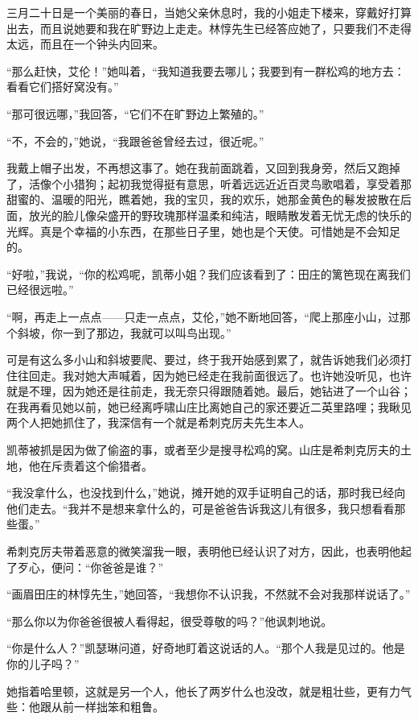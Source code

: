 \par 三月二十日是一个美丽的春日，当她父亲休息时，我的小姐走下楼来，穿戴好打算出去，而且说她要和我在旷野边上走走。林惇先生已经答应她了，只要我们不走得太远，而且在一个钟头内回来。
\par “那么赶快，艾伦！”她叫着，“我知道我要去哪儿；我要到有一群松鸡的地方去：看看它们搭好窝没有。”
\par “那可很远哪，”我回答，“它们不在旷野边上繁殖的。”
\par “不，不会的，”她说，“我跟爸爸曾经去过，很近呢。”
\par 我戴上帽子出发，不再想这事了。她在我前面跳着，又回到我身旁，然后又跑掉了，活像个小猎狗；起初我觉得挺有意思，听着远远近近百灵鸟歌唱着，享受着那甜蜜的、温暖的阳光，瞧着她，我的宝贝，我的欢乐，她那金黄色的鬈发披散在后面，放光的脸儿像朵盛开的野玫瑰那样温柔和纯洁，眼睛散发着无忧无虑的快乐的光辉。真是个幸福的小东西，在那些日子里，她也是个天使。可惜她是不会知足的。
\par “好啦，”我说，“你的松鸡呢，凯蒂小姐？我们应该看到了：田庄的篱笆现在离我们已经很远啦。”
\par “啊，再走上一点点——只走一点点，艾伦，”她不断地回答，“爬上那座小山，过那个斜坡，你一到了那边，我就可以叫鸟出现。”
\par 可是有这么多小山和斜坡要爬、要过，终于我开始感到累了，就告诉她我们必须打住往回走。我对她大声喊着，因为她已经走在我前面很远了。也许她没听见，也许就是不理，因为她还是往前走，我无奈只得跟随着她。最后，她钻进了一个山谷；在我再看见她以前，她已经离呼啸山庄比离她自己的家还要近二英里路哩；我瞅见两个人把她抓住了，我深信有一个就是希刺克厉夫先生本人。
\par 凯蒂被抓是因为做了偷盗的事，或者至少是搜寻松鸡的窝。山庄是希刺克厉夫的土地，他在斥责着这个偷猎者。
\par “我没拿什么，也没找到什么，”她说，摊开她的双手证明自己的话，那时我已经向他们走去。“我并不是想来拿什么的，可是爸爸告诉我这儿有很多，我只想看看那些蛋。”
\par 希刺克厉夫带着恶意的微笑溜我一眼，表明他已经认识了对方，因此，也表明他起了歹心，便问：“你爸爸是谁？”
\par “画眉田庄的林惇先生，”她回答，“我想你不认识我，不然就不会对我那样说话了。”
\par “那么你以为你爸爸很被人看得起，很受尊敬的吗？”他讽刺地说。
\par “你是什么人？”凯瑟琳问道，好奇地盯着这说话的人。“那个人我是见过的。他是你的儿子吗？”
\par 她指着哈里顿，这就是另一个人，他长了两岁什么也没改，就是粗壮些，更有力气些：他跟从前一样拙笨和粗鲁。
